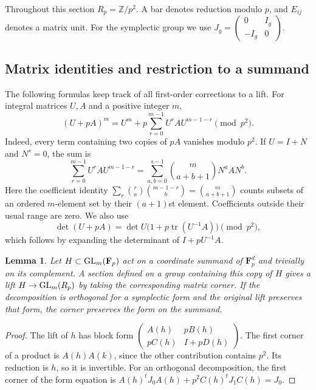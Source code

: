 \documentclass[11pt]{article}
\newcommand{\Fp}{\mathbf F_p}\newcommand{\OO}{\mathcal O}
\newtheorem{lemma}[theorem]{Lemma}\newtheorem{proposition}[theorem]{Proposition}
\theoremstyle{definition}\newtheorem{definition}[theorem]{Definition}
\theoremstyle{remark}\newtheorem{remark}[theorem]{Remark}
\begin{document}
Throughout this section $R_p=\mathbb Z/p^2$. A bar denotes reduction modulo
$p$, and $E_{ij}$ denotes a matrix unit. For the symplectic group we use
$J_g=\left(\begin{smallmatrix}0&I_g\\-I_g&0\end{smallmatrix}\right)$.

\subsection{Matrix identities and restriction to a summand}

The following formulas keep track of all first-order corrections to a lift.
For integral matrices $U,A$ and a positive integer $m$,
\begin{equation}\label{eq:power-correction}
 (U+pA)^m=U^m+p\sum_{r=0}^{m-1}U^rAU^{m-1-r}\pmod {p^2}.
\end{equation}
Indeed, every term containing two copies of $pA$ vanishes modulo $p^2$.
If $U=I+N$ and $N^s=0$, the sum is
\begin{equation}\label{eq:binomial-correction}
 \sum_{r=0}^{m-1}U^rAU^{m-1-r}
 =\sum_{a,b=0}^{s-1}\binom m{a+b+1}N^aAN^b.
\end{equation}
Here the coefficient identity
$\sum_r\binom ra\binom{m-1-r}b=\binom m{a+b+1}$ counts subsets of an
ordered $m$-element set by their $(a+1)$st element. Coefficients outside their
usual range are zero. We also use
\begin{equation}\label{eq:det-correction}
 \det(U+pA)=\det U\bigl(1+p\operatorname{tr}(U^{-1}A)\bigr)
                       \pmod {p^2},
\end{equation}
which follows by expanding the determinant of $I+pU^{-1}A$.

\begin{lemma}\label{lem:corner}
Let $H\subset\GL_m(\Fp)$ act on a coordinate summand of $\Fp^d$ and
trivially on its complement. A section defined on a group containing this
copy of $H$ gives a lift $H\to\operatorname{GL}_m(R_p)$ by taking the corresponding
matrix corner. If the decomposition is orthogonal for a symplectic form
and the original lift preserves that form, the corner preserves the form
on the summand.
\end{lemma}
\begin{proof}
The lift of $h$ has block form
$\left(\begin{smallmatrix}A(h)&pB(h)\\pC(h)&I+pD(h)\end{smallmatrix}\right)$.
The first corner of a product is $A(h)A(k)$, since the other contribution
contains $p^2$. Its reduction is $h$, so it is invertible. For an orthogonal
decomposition, the first corner of the form equation is
$A(h)^tJ_0A(h)+p^2C(h)^tJ_1C(h)=J_0$.
\end{proof}
\end{document}
